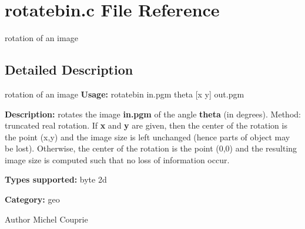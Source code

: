 \section{rotatebin.c File Reference}
\label{rotatebin_8c}


rotation of an image  




\subsection{Detailed Description}
rotation of an image {\bfseries Usage:} rotatebin in.pgm theta [x y] out.pgm

{\bfseries Description:} rotates the image {\bfseries in.pgm} of the angle {\bfseries theta} (in degrees). Method: truncated real rotation. If {\bfseries x} and {\bfseries y} are given, then the center of the rotation is the point (x,y) and the image size is left unchanged (hence parts of object may be lost). Otherwise, the center of the rotation is the point (0,0) and the resulting image size is computed such that no loss of information occur.

{\bfseries Types supported:} byte 2d

{\bfseries Category:} geo

\begin{DoxyAuthor}{Author}
Michel Couprie 
\end{DoxyAuthor}
